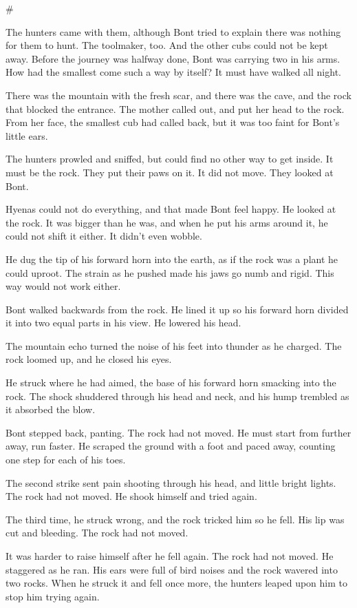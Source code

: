 \#

The hunters came with them, although Bont tried to explain there was nothing for them to hunt. The toolmaker, too. And the other cubs could not be kept away. Before the journey was halfway done, Bont was carrying two in his arms. How had the smallest come such a way by itself? It must have walked all night.

There was the mountain with the fresh scar, and there was the cave, and the rock that blocked the entrance. The mother called out, and put her head to the rock. From her face, the smallest cub had called back, but it was too faint for Bont's little ears.

The hunters prowled and sniffed, but could find no other way to get inside. It must be the rock. They put their paws on it. It did not move. They looked at Bont.

Hyenas could not do everything, and that made Bont feel happy. He looked at the rock. It was bigger than he was, and when he put his arms around it, he could not shift it either. It didn't even wobble.

He dug the tip of his forward horn into the earth, as if the rock was a plant he could uproot. The strain as he pushed made his jaws go numb and rigid. This way would not work either.

Bont walked backwards from the rock. He lined it up so his forward horn divided it into two equal parts in his view. He lowered his head.

The mountain echo turned the noise of his feet into thunder as he charged. The rock loomed up, and he closed his eyes.

He struck where he had aimed, the base of his forward horn smacking into the rock. The shock shuddered through his head and neck, and his hump trembled as it absorbed the blow.

Bont stepped back, panting. The rock had not moved. He must start from further away, run faster. He scraped the ground with a foot and paced away, counting one step for each of his toes.

The second strike sent pain shooting through his head, and little bright lights. The rock had not moved. He shook himself and tried again.

The third time, he struck wrong, and the rock tricked him so he fell. His lip was cut and bleeding. The rock had not moved.

It was harder to raise himself after he fell again. The rock had not moved. He staggered as he ran. His ears were full of bird noises and the rock wavered into two rocks. When he struck it and fell once more, the hunters leaped upon him to stop him trying again.

